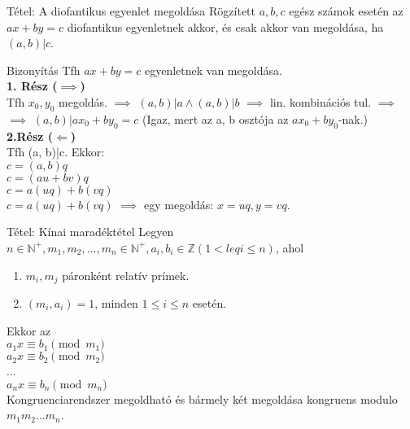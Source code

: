 \documentclass{beamer}
\begin{document}
\begin{frame}

\begin{block}{Tétel: A diofantikus egyenlet megoldása}
Rögzített $a, b, c$ egész számok esetén az \textbf{$ax + by = c$} diofantikus egyenletnek akkor, és csak akkor van megoldása, ha $(a, b)|c$.
\end{block}

\begin{block}{Bizonyítás}
Tfh $ax + by = c$ egyenletnek van megoldása.\\
\textbf{1. Rész ($\implies$)}\\
\smallskip
Tfh $x_0, y_0$ megoldás. $\implies$ $(a, b)|a \land (a, b)|b$ $\implies$ lin. kombinációs tul. $\implies$\\
$\implies$ $(a, b)|ax_0 + by_0 = c$ (Igaz, mert az a, b osztója az $ax_0 + by_0$-nak.)\\
\bigskip
\textbf{2.Rész ($\Longleftarrow$)}\\
\smallskip
Tfh (a, b)|c. Ekkor:\\
$c = (a, b)q$\\
$c = (au + bv)q$\\
$c = a(uq) + b(vq)$\\
$c = a(uq) + b(vq)$ $\implies$ egy megoldás: $x = uq, y = vq$.\\

\end{block}

\end{frame}

\begin{frame}

\begin{block}{Tétel: Kínai maradéktétel}
Legyen $n \in \mathbb{N}^+, m_1, m_2, ..., m_n \in \mathbb{N}^+, a_i, b_i \in \mathbb{Z} (1 <leq i \leq n)$, ahol
\begin{enumerate}
\item $m_i, m_j$ páronként relatív prímek.
\item $(m_i, a_i) = 1$, minden $1 \leq i \leq n$ esetén.
\end{enumerate}
Ekkor az\\
\bigskip
	$a_1x \equiv b_1 \pmod{m_1}$\\
	$a_2x \equiv b_2 \pmod{m_2}$\\
	...\\
	$a_nx \equiv b_n \pmod{m_n}$\\
\bigskip
Kongruenciarendszer megoldható és bármely két megoldása kongruens modulo $m_1m_2...m_n$.

\end{block}

\end{frame}
\end{document}
